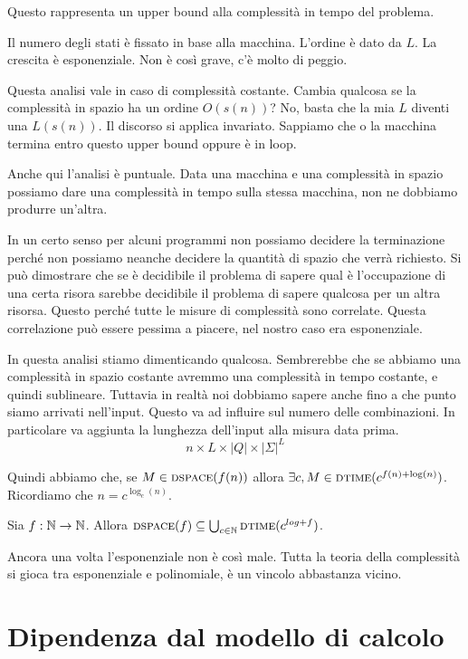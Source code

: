 Questo rappresenta un upper bound alla complessità in tempo del problema.

Il numero degli stati è fissato in base alla macchina. L'ordine è dato da $L$. La crescita è
esponenziale. Non è così grave, c'è molto di peggio.

Questa analisi vale in caso di complessità costante. Cambia qualcosa se la complessità in spazio
ha un ordine $O(s(n))$? No, basta che la mia $L$ diventi una $L(s(n))$. Il discorso si applica
invariato. Sappiamo che o la macchina termina entro questo upper bound oppure è in loop.

Anche qui l'analisi è puntuale. Data una macchina e una complessità in spazio possiamo dare una
complessità in tempo sulla stessa macchina, non ne dobbiamo produrre un'altra.

In un certo senso per alcuni programmi non possiamo decidere la terminazione perché non possiamo
neanche decidere la quantità di spazio che verrà richiesto. Si può dimostrare che se è decidibile il
problema di sapere qual è l'occupazione di una certa risora sarebbe decidibile il problema di sapere
qualcosa per un altra risorsa. Questo perché tutte le misure di complessità sono correlate. Questa
correlazione può essere pessima a piacere, nel nostro caso era esponenziale.

In questa analisi stiamo dimenticando qualcosa. Sembrerebbe che se abbiamo una complessità in
spazio costante avremmo una complessità in tempo costante, e quindi sublineare. Tuttavia in realtà
noi dobbiamo sapere anche fino a che punto siamo arrivati nell'input. Questo va ad influire sul
numero delle combinazioni. In particolare va aggiunta la lunghezza dell'input alla misura data
prima.
\begin{equation*}
    n\times L \times |Q| \times |\Sigma|^{L}
\end{equation*}

Quindi abbiamo che, se $M \in \textsc{dspace}(f(n))$ allora $\exists c, M \in \textsc{dtime}(c^{f(n) + \log(n)})$.
Ricordiamo che $n = c^{\log_{c}(n)}$.

\begin{thm}
    Sia $f: \mathbb{N} \to \mathbb{N}$. Allora $\textsc{dspace}(f) \subseteq \bigcup_{c \in \mathbb{N}}\textsc{dtime}(c^{log + f})$.
\end{thm}

Ancora una volta l'esponenziale non è così male. Tutta la teoria della complessità si gioca tra
esponenziale e polinomiale, è un vincolo abbastanza vicino.

\section{Dipendenza dal modello di calcolo}

